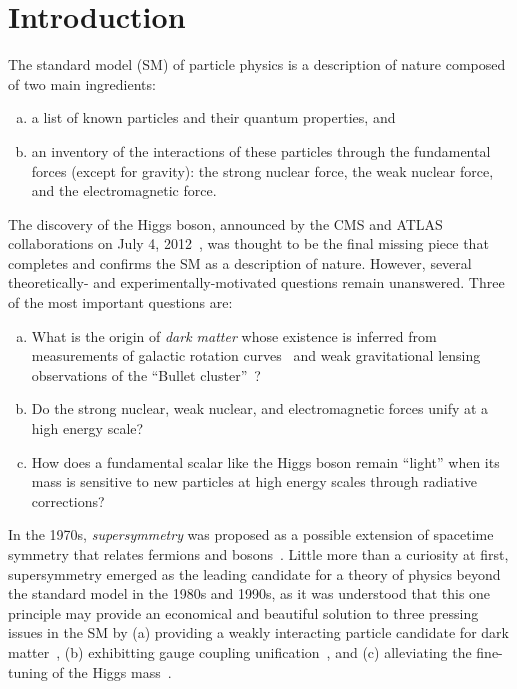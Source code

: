 \chapter{Introduction}
\label{ch:intro}

The standard model (SM) of particle physics is a description of nature
composed of two main ingredients:
\begin{enumerate}[(a)]
\item a list of known particles and their quantum properties, and
\item an inventory of the interactions of these particles through the fundamental forces
(except for gravity): the strong nuclear force, the weak nuclear force, and the electromagnetic
force. 
\end{enumerate}
The discovery of the Higgs boson, announced by the CMS and ATLAS
collaborations on July 4, 2012~\cite{CMShiggs,ATLAShiggs}, was
thought to be the final missing piece that completes and confirms the
SM as a description of nature. However, several theoretically- and
experimentally-motivated questions remain unanswered. Three
of the most important questions are:
\begin{enumerate}[(a)]
\item What is the origin of \emph{dark matter} whose existence is
  inferred from measurements of galactic rotation curves~\cite{1980ApJrotationcurves,1989HIrotationcurves} and weak gravitational lensing
  observations of the ``Bullet cluster''~\cite{Clowe:2006eq}?
\item Do the strong nuclear, weak nuclear, and electromagnetic
  forces unify at a high energy scale?
\item How does a fundamental scalar like the Higgs boson remain
  ``light'' when its mass is sensitive to new particles at high energy
  scales through radiative corrections?
\end{enumerate}

In the 1970s, \emph{supersymmetry} was proposed as a
possible extension of spacetime symmetry that relates fermions and
bosons~\cite{Ramond,Golfand,Volkov,Wess,Fayet}. Little
more than a curiosity at first, supersymmetry
emerged as the leading candidate for a theory of physics beyond the
standard model in the 1980s and 1990s, as it was understood that this
one principle may provide an economical and beautiful solution to
three pressing issues in the SM by (a) providing a weakly interacting particle candidate for dark
matter~\cite{Ellis:1983ew,Jungman:1995df}, (b) exhibitting gauge coupling
unification~\cite{Dimopoulos:1981yj,Marciano:1981un,Einhorn:1981sx,Ibanez:1981yh,Amaldi:1991cn,Langacker:1995fk},
and (c) alleviating the fine-tuning of the Higgs mass~\cite{Witten:1981nf,Dimopoulos:1981zb,Dine:1981za,Dimopoulos:1981au,Sakai:1981gr,Kaul:1981hi}.


